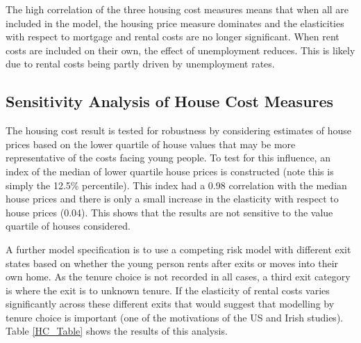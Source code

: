 \documentclass[12pt]{article}
\begin{document}
The high correlation of the three housing cost measures means that when all are included in the model, the housing price measure dominates and the elasticities with respect to mortgage and rental costs are no longer significant. When rent costs are included on their own, the effect of unemployment reduces. This is likely due to rental costs being partly driven by unemployment rates.

\subsection{Sensitivity Analysis of House Cost Measures}

The housing cost result is tested for robustness by considering estimates of house prices based on the lower quartile of house values that may be more representative of the costs facing young people. To test for this influence, an index of the median of lower quartile house prices is constructed (note this is simply the 12.5\% percentile). This index had a 0.98 correlation with the median house prices and there is only a small increase in the elasticity with respect to house prices (0.04). This shows that the results are not sensitive to the value quartile of houses considered.

A further model specification is to use a competing risk model with different exit states based on whether the young person rents after exits or moves into their own home. As the tenure choice is not recorded in all cases, a third exit category is where the exit is to unknown tenure. If the elasticity of rental costs varies significantly across these different exits that would suggest that modelling by tenure choice is important (one of the motivations of the US and Irish studies). Table \ref{HC_Table} shows the results of this analysis.
\end{document}
